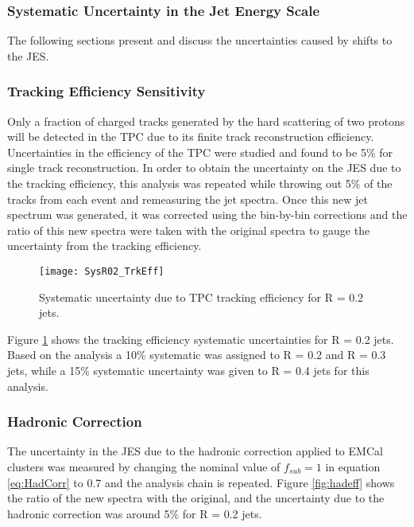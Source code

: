 \subsubsection{Systematic Uncertainty in the Jet Energy Scale}

The following sections present and discuss the uncertainties caused by shifts to the JES. 

\subsubsection{Tracking Efficiency Sensitivity}
Only a fraction of charged tracks generated by the hard scattering of two protons will be detected in the TPC due to its finite track reconstruction efficiency.  Uncertainties in the efficiency of the TPC were studied and found to be 5\% for single track reconstruction\cite{Abelev:2013ala}.  In order to obtain the uncertainty on the JES due to the tracking efficiency, this analysis was repeated while throwing out 5\% of the tracks from each event and remeasuring the jet spectra.  Once this new jet spectrum was generated, it was corrected using the bin-by-bin corrections and the ratio of this new spectra were taken with the original spectra to gauge the uncertainty from the tracking efficiency.


\begin{figure}[t!]
\texttt{[image: SysR02\_TrkEff]}
\centering
\caption{Systematic uncertainty due to TPC tracking efficiency for R = 0.2 jets.}
\label{fig:trkbodysys}
\end{figure}


Figure \ref{fig:trkbodysys} shows the tracking efficiency systematic uncertainties for R = 0.2 jets.  Based on the analysis a 10\% systematic was assigned to R = 0.2 and R = 0.3 jets, while a 15\% systematic uncertainty was given to R = 0.4 jets for this analysis.

\subsubsection{Hadronic Correction}



The uncertainty in the JES due to the hadronic correction applied to EMCal clusters was measured by changing the nominal value of $f_{sub} = 1$ in equation \ref{eq:HadCorr} to 0.7 and the analysis chain is repeated.  Figure \ref{fig:hadeff} shows the ratio of the new spectra with the original, and the uncertainty due to the hadronic correction was around 5\% for R = 0.2 jets.

